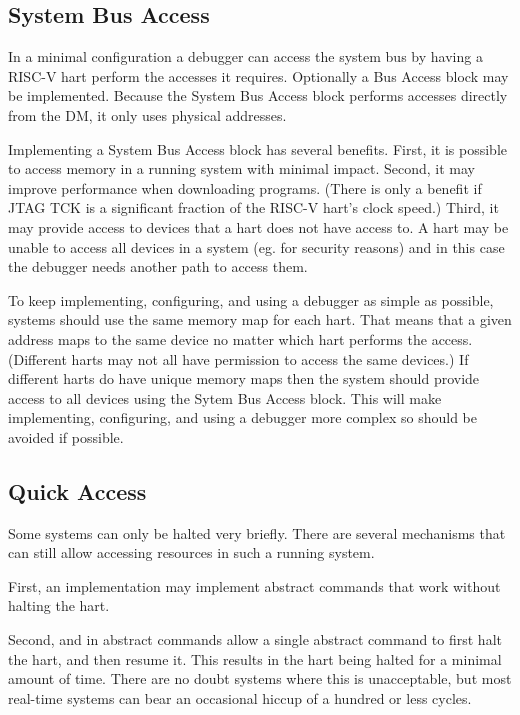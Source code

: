 \documentclass{article}
\begin{document}
\subsection{System Bus Access} \label{systembusaccess}

In a minimal configuration a debugger can access the system bus by having a
RISC-V hart perform the accesses it requires. Optionally a Bus Access block may
be implemented. Because the System Bus Access block performs accesses directly
from the DM, it only uses physical addresses.

Implementing a System Bus Access block has several benefits.
First, it is possible to
access memory in a running system with minimal impact.  Second, it may improve
performance when downloading programs. (There is only a benefit if JTAG TCK is a
significant fraction of the RISC-V hart's clock speed.)  Third, it may provide
access to devices that a hart does not have access to. A hart may be unable to
access all devices in a system (eg. for security reasons) and in this case the
debugger needs another path to access them.

To keep implementing, configuring, and using a debugger as simple as possible,
systems should use the same memory map for each hart. That means that a given
address maps to the same device no matter which hart performs the access.
(Different harts may not all have permission to access the same devices.) If
different harts do have unique memory maps then the system should provide
access to all devices using the Sytem Bus Access block.
This will make implementing,
configuring, and using a debugger more complex so should be avoided if
possible.

\subsection{Quick Access}

Some systems can only be halted very briefly. There are several mechanisms that
can still allow accessing resources in such a running system.

First, an implementation may implement abstract commands that work without
halting the hart.

Second, \Fprehalt and \Fpostresume in abstract commands allow a single abstract
command to first halt the hart, and then resume it. This results in the hart
being halted for a minimal amount of time. There are no doubt systems where
this is unacceptable, but most real-time systems can bear an occasional hiccup
of a hundred or less cycles.
\end{document}
